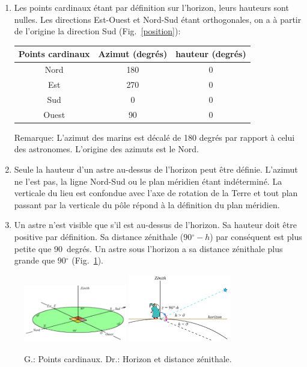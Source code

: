 \documentclass[a4paper,10pt]{report}
\renewcommand{\deg}{\ensuremath{^{\circ}}}
\begin{document}
\begin{Answer}
  \begin{enumerate}
  \item Les points cardinaux étant par définition sur l'horizon, leurs
    hauteurs sont nulles. Les directions Est-Ouest et Nord-Sud étant
    orthogonales, on a à partir de l'origine la direction Sud
    (Fig.~\ref{position}):
    \begin{center}
      \begin{tabular}{|c|c|c|}
        \hline
        Points cardinaux & Azimut (degrés) & hauteur (degrés) \\ \hline
        Nord  & 180 & 0 \\ \hline
        Est   & 270 & 0 \\ \hline
        Sud   & 0   & 0 \\ \hline
        Ouest & 90  & 0 \\ \hline
      \end{tabular}
    \end{center}
    Remarque: L'azimut des marins est décalé de 180 degrés par rapport
    à celui des astronomes. L'origine des azimuts est le Nord.

  \item Seule la hauteur d'un astre au-dessus de l'horizon peut être
    définie. L'azimut ne l'est pas, la ligne Nord-Sud ou le plan
    méridien étant indéterminé. La verticale du lieu est confondue
    avec l'axe de rotation de la Terre et tout plan passant par la
    verticale du pôle répond à la définition du plan méridien.

  \item Un astre n'est visible que s'il est au-dessus de l'horizon. Sa
    hauteur doit être positive par définition. Sa distance zénithale
    ($90\deg - h$) par conséquent est plus petite que 90~degrés.  Un
    astre sous l'horizon a sa distance zénithale plus grande que
    $90\deg$ (Fig.~\ref{position2}).
  \end{enumerate}

  \begin{figure}[htp]
    \begin{center}
      \includegraphics[width=0.4\textwidth]{position}
      \includegraphics[width=0.4\textwidth]{position2}
    \end{center}
    \label{position}
    \label{position2}
    \caption{G.: Points cardinaux. Dr.: Horizon et distance zénithale.}
  \end{figure}
\end{Answer}
\end{document}
